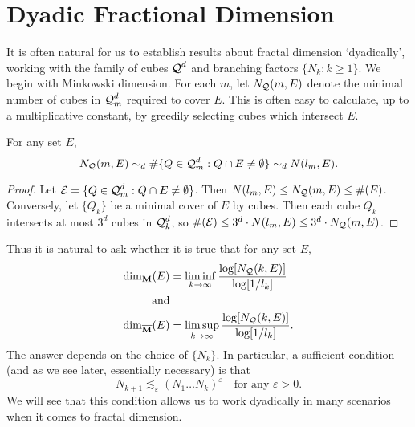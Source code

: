 \section{Dyadic Fractional Dimension}

It is often natural for us to establish results about fractal dimension `dyadically', working with the family of cubes $\operatorname{\mathcal{Q}}^d$ and branching factors $\{ N_k : k \geq 1 \}$. We begin with Minkowski dimension. For each $m$, let $N_{\operatorname{\mathcal{Q}}}(m,E)$ denote the minimal number of cubes in $\operatorname{\mathcal{Q}}_m^d$ required to cover $E$. This is often easy to calculate, up to a multiplicative constant, by greedily selecting cubes which intersect $E$.

\begin{lemma} \label{comparableCovers}
	For any set $E$,
	\[ N_{\operatorname{\mathcal{Q}}}(m,E) \sim_d \# \{ Q \in \operatorname{\mathcal{Q}}_m^d : Q \cap E \neq \emptyset \} \sim_d N(l_m,E). \]
\end{lemma}
\begin{proof}
	Let $\mathcal{E} = \{ Q \in \operatorname{\mathcal{Q}}_m^d : Q \cap E \neq \emptyset \}$. Then $N(l_m,E) \leq N_{\operatorname{\mathcal{Q}}}(m,E) \leq \#(E)$. Conversely, let $\{ Q_k \}$ be a minimal cover of $E$ by cubes. Then each cube $Q_k$ intersects at most $3^d$ cubes in $\operatorname{\mathcal{Q}}_k^d$, so $\#(\mathcal{E}) \leq 3^d \cdot N(l_m,E) \leq 3^d \cdot N_{\operatorname{\mathcal{Q}}}(m,E)$.
\end{proof}

Thus it is natural to ask whether it is true that for any set $E$,
%
\begin{equation} \label{definingSequence}
	\begin{aligned}
		\operatorname{\dim_{\underline{\mathbf{M}}}}(E) &= \liminf_{k \to \infty} \frac{\log[N_{\operatorname{\mathcal{Q}}}(k,E)]}{\log[1/l_k]}\\
		\text{and}\\
		\operatorname{\dim_{\overline{\mathbf{M}}}}(E) &= \limsup_{k \to \infty} \frac{\log[N_{\operatorname{\mathcal{Q}}}(k,E)]}{\log[1/l_k]}.
	\end{aligned}
\end{equation}
%
The answer depends on the choice of $\{ N_k \}$. In particular, a sufficient condition (and as we see later, essentially necessary) is that
%
\begin{equation} \label{definingsequencegrowthrate}
	N_{k+1} \lesssim_\varepsilon (N_1 \dots N_k)^\varepsilon \quad \text{for any $\varepsilon > 0$}.
\end{equation}
%
We will see that this condition allows us to work dyadically in many scenarios when it comes to fractal dimension.

%
%


